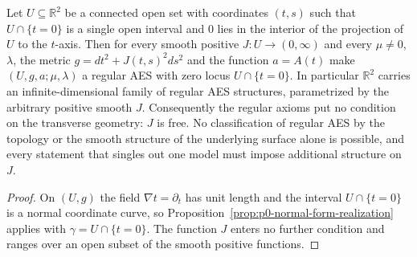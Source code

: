 \begin{corollary}
\label{cor:p0-normal-form-softness}
Let $U\subseteq\mathbb R^2$ be a connected open set with coordinates $(t,s)$ such
that $U\cap\{t=0\}$ is a single open interval and $0$ lies in the interior of the
projection of $U$ to the $t$-axis.  Then for every smooth positive
$J:U\to(0,\infty)$ and every $\mu\ne0$, $\lambda$, the metric
$g=dt^2+J(t,s)^2ds^2$ and the function $a=A(t)$ make
$(U,g,a;\mu,\lambda)$ a regular AES with zero locus $U\cap\{t=0\}$.  In
particular $\mathbb R^2$ carries an infinite-dimensional family of regular AES
structures, parametrized by the arbitrary positive smooth $J$.  Consequently the
regular axioms put no condition on the transverse geometry: $J$ is free.  No
classification of regular AES by the topology or the smooth structure of the
underlying surface alone is possible, and every statement that singles out one
model must impose additional structure on $J$.
\end{corollary}

\begin{proof}
On $(U,g)$ the field $\nabla t=\partial_t$ has unit length and the interval
$U\cap\{t=0\}$ is a normal coordinate curve, so
Proposition~\ref{prop:p0-normal-form-realization} applies with
$\gamma=U\cap\{t=0\}$.  The function $J$ enters no further condition and ranges
over an open subset of the smooth positive functions.
\end{proof}

